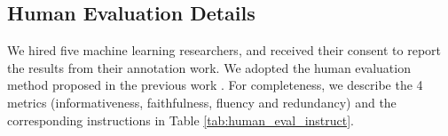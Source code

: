 


\subsection{Human Evaluation Details}
We hired five machine learning researchers, and received their consent to report the results from their annotation work.
We adopted the human evaluation method proposed in the previous work \citep{xie-etal-2024-shot}.
For completeness, we describe the 4 metrics (informativeness, faithfulness, fluency and redundancy) and the corresponding instructions in Table \ref{tab:human_eval_instruct}.


